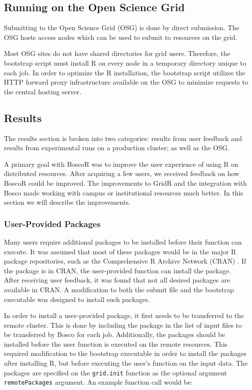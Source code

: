 \subsection{Running on the Open Science Grid}

Submitting to the Open Science Grid (OSG) is done by direct submission.  The OSG hosts access nodes which can be used to submit to resources on the grid.

Most OSG sites do not have shared directories for grid users.  Therefore, the bootstrap script must install R on every node in a temporary directory unique to each job.  In order to optimize the R installation, the bootstrap script utilizes the HTTP forward proxy infrastructure \cite{garzoglio2012supporting} available on the OSG to minimize requests to the central hosting server.


\subsection{Results}
\label{sec:boscorresults}

The results section is broken into two categories: results from user feedback and results from experimental runs on a production cluster; as well as the OSG.

A primary goal with BoscoR was to improve the user experience of using R on distributed resources. After acquiring a few users, we received feedback on how BoscoR could be improved.  The improvements to GridR and the integration with Bosco made working with campus or institutional resources much better.  In this section we will describe the improvements.

\subsubsection{User-Provided Packages}

Many users require additional packages to be installed before their function can execute.  It was assumed that most of these packages would be in the major R package repositories, such as the Comprehensive R Archive Network (CRAN) \cite{cran}.  If the package is in CRAN, the user-provided function can install the package.  After receiving user feedback, it was found that not all desired packages are available in CRAN.  A modification to both the submit file and the bootstrap executable was designed to install such packages.

In order to install a user-provided package, it first needs to be transferred to the remote cluster.  This is done by including the package in the list of input files to be transferred by Bosco for each job.  Additionally, the packages should be installed before the user function is executed on the remote resources.  This required modification to the bootstrap executable in order to install the packages after installing R, but before executing the user's function on the input data.  The packages are specified on the \texttt{grid.init} function as the optional argument \texttt{remotePackages} argument.  An example function call would be:

